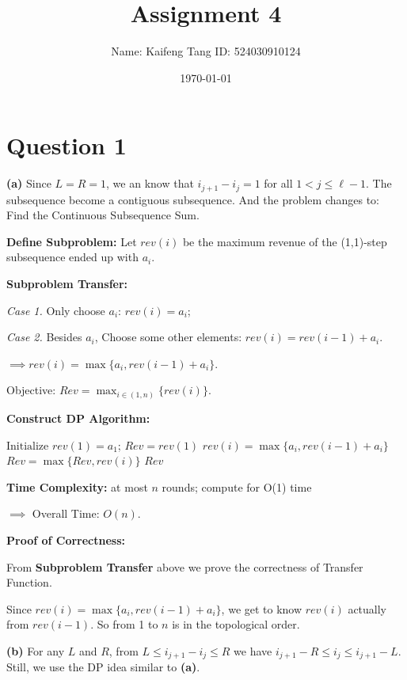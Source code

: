 \documentclass[11pt]{article}
\title{\textbf{Assignment 4}}
\author{Name: Kaifeng Tang \quad ID: 524030910124}
\date{\today}
\begin{document}
\maketitle 
\section*{Question 1}
\textbf{(a)} Since $L=R=1$, we an know that $i_{j+1}-i_j = 1 $ for all $1<j \le \ell-1$. 
The subsequence become a contiguous subsequence. And the problem changes to: 
Find the Continuous Subsequence Sum.  

\qquad \textbf{Define Subproblem:} Let $rev(i)$ be the maximum revenue of the (1,1)-step subsequence ended up with $a_i$.

\qquad \textbf{Subproblem Transfer: } 

\qquad \qquad \textit{Case 1. } Only choose $a_i$: $rev(i) = a_i$; 

\qquad \qquad \textit{Case 2. } Besides $a_i$, Choose some other elements: $rev(i) = rev(i-1) + a_i$.  

\qquad $\implies rev(i) = \max\{a_i, rev(i-1) + a_i\}$. 

\qquad Objective: $Rev = \max_{i \in (1,n)}\{rev(i)\}$. 

\qquad \textbf{Construct DP Algorithm: }
\begin{algorithm}
\caption{Find the maximum (1,1)-step subsequence}
\begin{algorithmic}[1] %
\State $\text{Initialize } rev(1)=a_1$; $Rev = rev(1)$
    \State $rev(i)=\max\{a_i, rev(i-1) + a_i\}$
    \State $Rev = \max\{Rev, rev(i)\}$
\EndFor
\State \Return $Rev$
\end{algorithmic}
\end{algorithm}

\qquad \textbf{Time Complexity: } at most $n$ rounds; compute for O(1) time

\qquad $\implies$ Overall Time: $O(n)$. 

\qquad \textbf{Proof of Correctness: }

\qquad From \textbf{Subproblem Transfer} above we prove the correctness of Transfer Function. 

\qquad Since $rev(i)=\max\{a_i, rev(i-1) + a_i\}$, we get to know $rev(i)$ actually from $rev(i-1)$. 
So from 1 to $n$ is in the topological order. 

\qquad 

\textbf{(b)} For any $L$ and $R$, from $L \le i_{j+1} - i_j \le R$ we have $i_{j+1}-R \le i_j \le i_{j+1}-L$. 
Still, we use the DP idea similar to \textbf{(a)}. 
\end{document}
